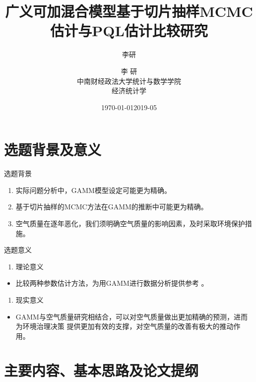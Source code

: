 \documentclass[ignorenonframetext,11pt,xcolor=dvipsnames,aspectratio=1610,hyperref={bookmarksdepth=4}]{beamer}
\author{李研}
\date{\today}
\date{2019-05}
\author[李\; 研(中南财经政法大学统计与数学学院)]{\CJKfamily{kai} 李 \enspace 研 \\ 中南财经政法大学统计与数学学院 \\ 经济统计学}
\title{广义可加混合模型基于切片抽样MCMC估计与PQL估计比较研究}
\providecommand{\tightlist}{%
  \setlength{\itemsep}{0pt}\setlength{\parskip}{0pt}}
\begin{document}
\frame{\titlepage}

\section{选题背景及意义}

\begin{frame}{选题背景}

\begin{enumerate}
\def\labelenumi{\arabic{enumi}.}
\tightlist
\item
  实际问题分析中，GAMM模型设定可能更为精确。
\item
  基于切片抽样的MCMC方法在GAMM的推断中可能更为精确。
\item
  空气质量在逐年恶化，我们须明确空气质量的影响因素，及时采取环境保护措施。
\end{enumerate}

\end{frame}

\begin{frame}{选题意义}

\begin{enumerate}
\def\labelenumi{\arabic{enumi}.}
\tightlist
\item
  理论意义
\end{enumerate}

\begin{itemize}
\tightlist
\item
  比较两种参数估计方法，为用GAMM进行数据分析提供参考 。
\end{itemize}

\begin{enumerate}
\def\labelenumi{\arabic{enumi}.}
\setcounter{enumi}{1}
\tightlist
\item
  现实意义
\end{enumerate}

\begin{itemize}
\tightlist
\item
  GAMM与空气质量研究相结合，可以对空气质量做出更加精确的预测，进而为环境治理决策
  提供更加有效的支撑，对空气质量的改善有极大的推动作用。
\end{itemize}

\end{frame}

\section{主要内容、基本思路及论文提纲}
\end{document}
